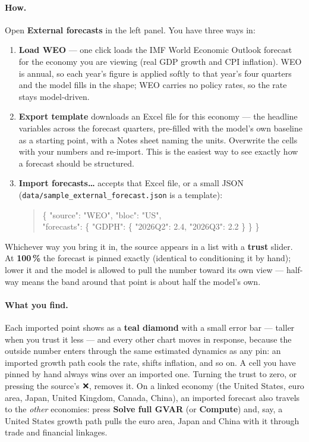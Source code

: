 \documentclass[11pt]{article}
\theoremstyle{definition}
\theoremstyle{remark}
\begin{document}
\paragraph{How.} Open \textbf{External forecasts} in the left panel. You have three ways in:
\begin{enumerate}
  \item \textbf{Load WEO} --- one click loads the IMF World Economic Outlook forecast for the
    economy you are viewing (real GDP growth and CPI inflation). WEO is annual, so each year's
    figure is applied softly to that year's four quarters and the model fills in the shape;
    WEO carries no policy rates, so the rate stays model-driven.
  \item \textbf{Export template} downloads an Excel file for this economy --- the headline
    variables across the forecast quarters, pre-filled with the model's own baseline as a
    starting point, with a Notes sheet naming the units. Overwrite the cells with your numbers
    and re-import. This is the easiest way to see exactly how a forecast should be structured.
  \item \textbf{Import forecasts\ldots} accepts that Excel file, or a small JSON
    (\texttt{data/sample\_external\_forecast.json} is a template):
\begin{quote}\small\ttfamily
\{ "source": "WEO", "bloc": "US",\\
\phantom{xx}"forecasts": \{ "GDPH": \{ "2026Q2": 2.4, "2026Q3": 2.2 \} \} \}
\end{quote}
\end{enumerate}
Whichever way you bring it in, the source appears in a list with a \textbf{trust} slider. At
\textbf{100\,\%} the forecast is pinned exactly (identical to conditioning it by hand); lower
it and the model is allowed to pull the number toward its own view --- half-way means the band
around that point is about half the model's own.

\paragraph{What you find.} Each imported point shows as a \textbf{teal diamond} with a small
error bar --- taller when you trust it less --- and every other chart moves in response,
because the outside number enters through the same estimated dynamics as any pin: an
imported growth path cools the rate, shifts inflation, and so on. A cell you have pinned by
hand always wins over an imported one. Turning the trust to zero, or pressing the source's
\textbf{✕}, removes it. On a linked economy (the United States, euro area, Japan, United
Kingdom, Canada, China), an imported forecast also travels to the \emph{other} economies: press
\textbf{Solve full GVAR} (or \textbf{Compute}) and, say, a United States growth path pulls the
euro area, Japan and China with it through trade and financial linkages.
\end{document}
